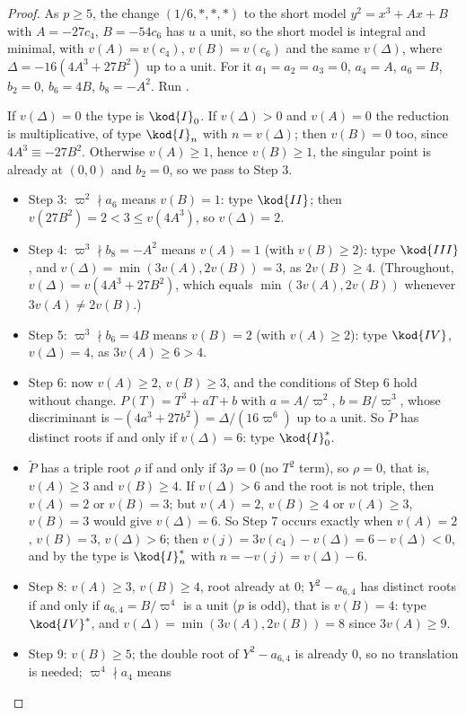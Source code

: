 \begin{proof}
As $p\ge5$, the change $(1/6,\ast,\ast,\ast)$ to the short model $y^2=x^3+Ax+B$ with $A=-27c_4$, $B=-54c_6$ has $u$ a unit,
so the short model is integral and minimal, with $v(A)=v(c_4)$, $v(B)=v(c_6)$ and the same $v(\Delta)$, where
$\Delta=-16(4A^3+27B^2)$ up to a unit. For it $a_1=a_2=a_3=0$, $a_4=A$, $a_6=B$, $b_2=0$, $b_6=4B$, $b_8=-A^2$. Run
.

If $v(\Delta)=0$ the type is $\kod{I}_0$. If $v(\Delta)>0$ and $v(A)=0$ the reduction is multiplicative, of type
$\kod{I}_n$ with $n=v(\Delta)$; then $v(B)=0$ too, since $4A^3\equiv-27B^2$. Otherwise $v(A)\ge1$, hence $v(B)\ge1$, the
singular point is already at $(0,0)$ and $b_2=0$, so we pass to Step 3.
\begin{itemize}
\item Step 3: $\varpi^2\nmid a_6$ means $v(B)=1$: type $\kod{II}$; then $v(27B^2)=2<3\le v(4A^3)$, so $v(\Delta)=2$.
\item Step 4: $\varpi^3\nmid b_8=-A^2$ means $v(A)=1$ (with $v(B)\ge2$): type $\kod{III}$, and
$v(\Delta)=\min(3v(A),2v(B))=3$, as $2v(B)\ge4$. (Throughout, $v(\Delta)=v(4A^3+27B^2)$, which equals $\min(3v(A),2v(B))$ whenever $3v(A)\ne2v(B)$.)
\item Step 5: $\varpi^3\nmid b_6=4B$ means $v(B)=2$ (with $v(A)\ge2$): type $\kod{IV}$, $v(\Delta)=4$, as $3v(A)\ge6>4$.
\item Step 6: now $v(A)\ge2$, $v(B)\ge3$, and the conditions of Step 6 hold without change. $P(T)=T^3+aT+b$ with
$a=A/\varpi^2$, $b=B/\varpi^3$, whose discriminant is $-(4a^3+27b^2)=\Delta/(16\varpi^6)$ up to a unit. So $\tilde P$ has distinct
roots if and only if $v(\Delta)=6$: type $\kod{I}_0^*$.
\item $\tilde P$ has a triple root $\rho$ if and only if $3\rho=0$ (no $T^2$ term), so $\rho=0$, that is, $v(A)\ge3$ and
$v(B)\ge4$. If $v(\Delta)>6$ and the root is not triple, then $v(A)=2$ or $v(B)=3$; but $v(A)=2$, $v(B)\ge4$ or
$v(A)\ge3$, $v(B)=3$ would give $v(\Delta)=6$. So Step 7 occurs exactly when $v(A)=2$, $v(B)=3$, $v(\Delta)>6$; then
$v(j)=3v(c_4)-v(\Delta)=6-v(\Delta)<0$, and by  the type is $\kod{I}_n^*$ with
$n=-v(j)=v(\Delta)-6$.
\item Step 8: $v(A)\ge3$, $v(B)\ge4$, root already at $0$; $Y^2-a_{6,4}$ has distinct roots if and only if $a_{6,4}=B/\varpi^4$ is a
unit ($p$ is odd), that is $v(B)=4$: type $\kod{IV}^*$, and $v(\Delta)=\min(3v(A),2v(B))=8$ since $3v(A)\ge9$.
\item Step 9: $v(B)\ge5$; the double root of $Y^2-a_{6,4}$ is already $0$, so no translation is needed; $\varpi^4\nmid a_4$ means

\end{itemize}
\end{proof}
